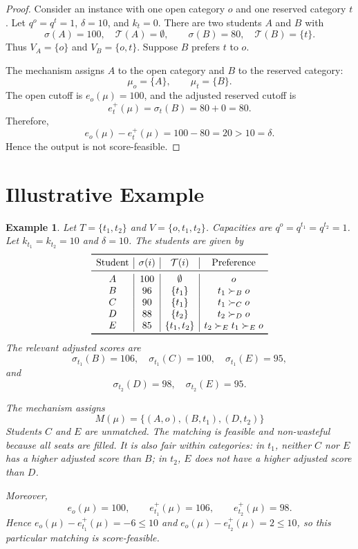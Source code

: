 \documentclass[10pt]{article}
\newtheorem{example}{Example}
\newcommand{\T}{\mathcal{T}}
\newcommand{\1}{\mathbf{1}}
\begin{document}
\begin{proof}
Consider an instance with one open category $o$ and one reserved category $t$. Let $q^o=q^t=1$, $\delta=10$, and $k_t=0$. There are two students $A$ and $B$ with
\[
\sigma(A)=100,\quad \T(A)=\emptyset,
\qquad
\sigma(B)=80,\quad \T(B)=\{t\}.
\]
Thus $V_A=\{o\}$ and $V_B=\{o,t\}$. Suppose $B$ prefers $t$ to $o$.

The mechanism assigns $A$ to the open category and $B$ to the reserved category:
\[
\mu_o=\{A\},\qquad \mu_t=\{B\}.
\]
The open cutoff is $e_o(\mu)=100$, and the adjusted reserved cutoff is
\[
e_t^+(\mu)=\sigma_t(B)=80+0=80.
\]
Therefore,
\[
e_o(\mu)-e_t^+(\mu)=100-80=20>10=\delta.
\]
Hence the output is not score-feasible.
\end{proof}

\section{Illustrative Example}

\begin{example}
Let $T=\{t_1,t_2\}$ and $V=\{o,t_1,t_2\}$. Capacities are $q^o=q^{t_1}=q^{t_2}=1$. Let $k_{t_1}=k_{t_2}=10$ and $\delta=10$. The students are given by
\[
\begin{array}{c|c|c|c}
\toprule
\text{Student} & \sigma(i) & \T(i) & \text{Preference} \\
\midrule
A & 100 & \emptyset & o \\
B & 96 & \{t_1\} & t_1\succ_B o \\
C & 90 & \{t_1\} & t_1\succ_C o \\
D & 88 & \{t_2\} & t_2\succ_D o \\
E & 85 & \{t_1,t_2\} & t_2\succ_E t_1\succ_E o \\
\bottomrule
\end{array}
\]
The relevant adjusted scores are
\[
\sigma_{t_1}(B)=106,\quad
\sigma_{t_1}(C)=100,\quad
\sigma_{t_1}(E)=95,
\]
and
\[
\sigma_{t_2}(D)=98,\quad
\sigma_{t_2}(E)=95.
\]

The mechanism assigns
\[
M(\mu)=\{(A,o),(B,t_1),(D,t_2)\}
\]
Students $C$ and $E$ are unmatched. The matching is feasible and non-wasteful because all seats are filled. It is also fair within categories: in $t_1$, neither $C$ nor $E$ has a higher adjusted score than $B$; in $t_2$, $E$ does not have a higher adjusted score than $D$.

Moreover,
\[
e_o(\mu)=100,
\qquad
e_{t_1}^+(\mu)=106,
\qquad
e_{t_2}^+(\mu)=98.
\]
Hence $e_o(\mu)-e_{t_1}^+(\mu)=-6\le 10$ and $e_o(\mu)-e_{t_2}^+(\mu)=2\le 10$, so this particular matching is score-feasible.
\end{example}
\end{document}
